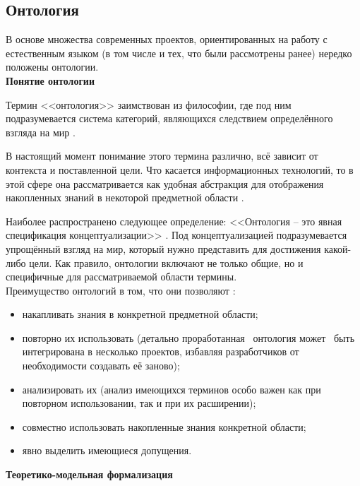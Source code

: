 \subsection{Онтология}
В основе множества современных проектов, ориентированных на работу с естественным языком (в том числе и тех, что были рассмотрены ранее) нередко положены онтологии. \\

\textbf{Понятие онтологии}

 Термин <<онтология>> заимствован из философии, где под ним подразумевается система категорий, являющихся следствием определённого взгляда на мир \cite{philosophy}.

В настоящий момент понимание этого термина различно, всё зависит от контекста и поставленной цели. Что касается информационных технологий, то в этой сфере она рассматривается как удобная абстракция для отображения накопленных знаний в некоторой предметной области \cite{isystem,gruber}.

Наиболее распространено следующее определение: <<Онтология -- это явная спецификация концептуализации>> \cite{gruber}. Под концептуализацией подразумевается упрощённый взгляд на мир, который нужно представить для достижения какой-либо цели. Как правило, онтологии включают не только общие, но и специфичные для рассматриваемой области термины. \\
%
Преимущество онтологий в том, что они позволяют \cite{ontology_guide}:
%
\begin{itemize}
	\item накапливать знания в конкретной предметной области;
	
	\item повторно их использовать (детально проработанная \, онтология может \, быть интегрирована в несколько проектов, избавляя разработчиков от \, необходимости создавать её заново);
	
	\item анализировать их (анализ имеющихся терминов особо важен как при повторном использовании, так и при их расширении);	
	
	\item совместно использовать накопленные знания конкретной области;
	
	\item явно выделить имеющиеся допущения. \newline
\end{itemize}

\textbf{Теоретико-модельная формализация}

